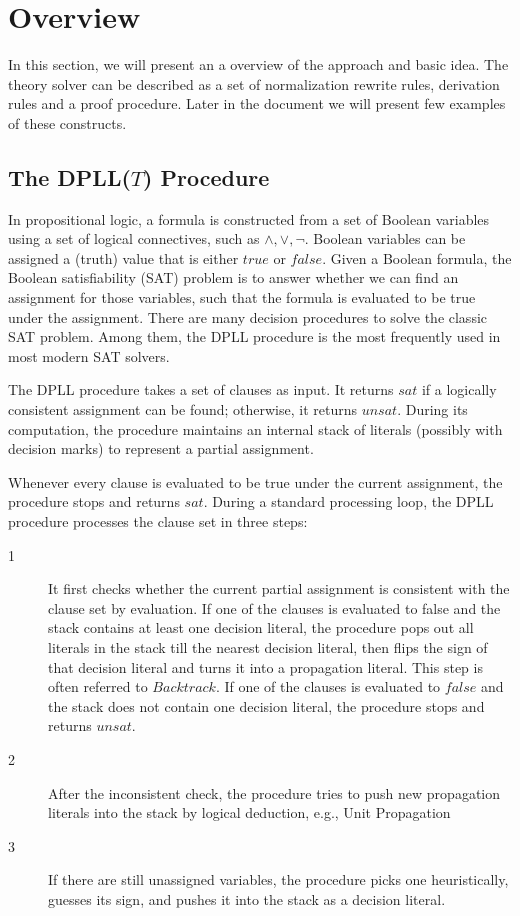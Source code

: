 
\section{Overview}
\label{sec:overview}
In this section, we will present an a overview of the approach and basic idea. The theory solver can be described as a set of normalization rewrite rules, derivation rules and a proof procedure. Later in the document we will present few examples of these constructs. 

\subsection{The DPLL(\(T\)) Procedure}
\label{sec:dpllt procedure}
In propositional logic, a formula is constructed from a set of Boolean variables using a set of logical connectives, such as \(\wedge, \vee, \neg\). Boolean variables can be assigned a (truth) value that is either \(true\) or \(false\). Given a Boolean formula, the Boolean satisfiability (SAT) problem is to answer whether we can find an assignment for those variables, such that the formula is evaluated to be true under the assignment. There are many decision procedures to solve the classic SAT problem. Among them, the DPLL procedure is the most frequently used in most modern SAT solvers. 

The DPLL procedure takes a set of clauses as input. It returns \(sat\) if a logically consistent assignment can be found; otherwise, it returns \(unsat\). During its computation, the procedure maintains an internal stack of literals (possibly with decision marks) to represent a partial assignment. 

Whenever every clause is evaluated to be true under the current assignment, the procedure stops and returns \(sat\). During a standard processing loop, the DPLL procedure processes the clause set in three steps:

\begin{description}
	\item[1] It first checks whether the current partial assignment is consistent with the clause set by evaluation. If one of the clauses is evaluated to false and the stack contains at least one decision literal, the procedure pops out all literals in the stack till the nearest decision literal, then flips the sign of that decision literal and turns it into a propagation literal. This step is often referred to \(Backtrack\). If one of the clauses is evaluated to \(false\) and the stack does not contain one decision literal, the procedure stops and returns \(unsat\).
	
	\item[2] After the inconsistent check, the procedure tries to push new propagation literals into the stack by logical deduction, e.g., Unit Propagation
	
	\item[3] If there are still unassigned variables, the procedure picks one heuristically, guesses its sign, and pushes it into the stack as a decision literal.

\end{description}


